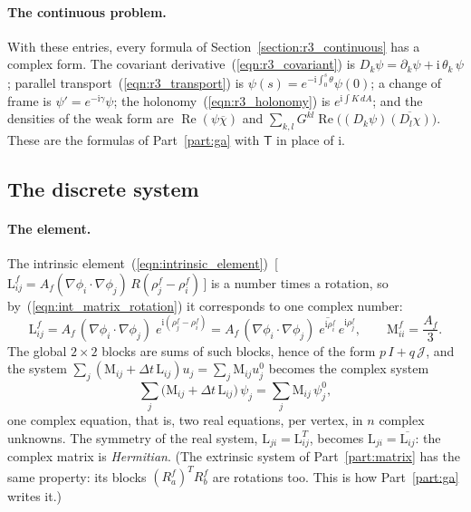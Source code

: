 \paragraph{The continuous problem.} With these entries, every formula of Section~\ref{section:r3_continuous} has a complex form. The covariant derivative~(\ref{eqn:r3_covariant}) is $D_k\psi = \partial_k\psi + \mathrm i\,\theta_k\,\psi$; parallel transport~(\ref{eqn:r3_transport}) is $\psi(s) = e^{-\mathrm i\int_0^s\theta}\psi(0)$; a change of frame is $\psi' = e^{-\mathrm i\gamma}\psi$; the holonomy~(\ref{eqn:r3_holonomy}) is $e^{\mathrm i\int K\,dA}$; and the densities of the weak form are $\operatorname{Re}(\psi\overline\chi)$ and $\sum_{k,l}G^{kl}\operatorname{Re}\big((D_k\psi)\overline{(D_l\chi)}\big)$. These are the formulas of Part~\ref{part:ga} with $\mathsf T$ in place of $\mathrm i$.

\subsection{The discrete system}

\paragraph{The element.} The intrinsic element~(\ref{eqn:intrinsic_element})~[\,$\mathrm L^f_{ij} = A_f(\nabla\phi_i\cdot\nabla\phi_j)\,R(\rho_j^f - \rho_i^f)$\,] is a number times a rotation, so by~(\ref{eqn:int_matrix_rotation}) it corresponds to one complex number:
\begin{equation}
\label{eqn:int_matrix_element}
\mathrm L^f_{ij} = A_f\,(\nabla\phi_i\cdot\nabla\phi_j)\; e^{\mathrm i(\rho_j^f - \rho_i^f)} = A_f\,(\nabla\phi_i\cdot\nabla\phi_j)\; \overline{e^{\mathrm i\rho_i^f}}\,e^{\mathrm i\rho_j^f}, \qquad \mathrm M^f_{ii} = \frac{A_f}{3} .
\end{equation}
The global $2\times 2$ blocks are sums of such blocks, hence of the form $p\,I + q\,\mathcal J$, and the system $\sum_j (\mathrm M_{ij} + \Delta t\,\mathrm L_{ij})u_j = \sum_j \mathrm M_{ij}u^0_j$ becomes the complex system
\begin{equation*}
\sum_j \big(\mathrm M_{ij} + \Delta t\,\mathrm L_{ij}\big)\,\psi_j = \sum_j \mathrm M_{ij}\,\psi^0_j ,
\end{equation*}
one complex equation, that is, two real equations, per vertex, in $n$ complex unknowns. The symmetry of the real system, $\mathrm L_{ji} = \mathrm L_{ij}^T$, becomes $\mathrm L_{ji} = \overline{\mathrm L_{ij}}$: the complex matrix is \emph{Hermitian}. (The extrinsic system of Part~\ref{part:matrix} has the same property: its blocks $(R_a^f)^TR_b^f$ are rotations too. This is how Part~\ref{part:ga} writes it.)

